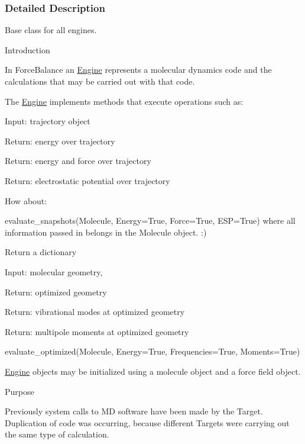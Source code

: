 \subsubsection{Detailed Description}
Base class for all engines. 


\begin{DoxyEnumerate}
\item Introduction
\end{DoxyEnumerate}

In Force\-Balance an \hyperlink{classforcebalance_1_1engine_1_1Engine}{Engine} represents a molecular dynamics code and the calculations that may be carried out with that code.

The \hyperlink{classforcebalance_1_1engine_1_1Engine}{Engine} implements methods that execute operations such as\-:
\begin{DoxyItemize}
\item Input\-: trajectory object
\item Return\-: energy over trajectory
\item Return\-: energy and force over trajectory
\item Return\-: electrostatic potential over trajectory
\item How about\-:
\item evaluate\-\_\-snapshots(Molecule, Energy=True, Force=True, E\-S\-P=True) where all information passed in belongs in the Molecule object. \-:)
\item Return a dictionary
\item Input\-: molecular geometry,
\item Return\-: optimized geometry
\item Return\-: vibrational modes at optimized geometry
\item Return\-: multipole moments at optimized geometry
\item evaluate\-\_\-optimized(Molecule, Energy=True, Frequencies=True, Moments=True)
\item \hyperlink{classforcebalance_1_1engine_1_1Engine}{Engine} objects may be initialized using a molecule object and a force field object.
\end{DoxyItemize}
\begin{DoxyEnumerate}
\item Purpose
\end{DoxyEnumerate}

Previously system calls to M\-D software have been made by the Target. Duplication of code was occurring, because different Targets were carrying out the same type of calculation.



